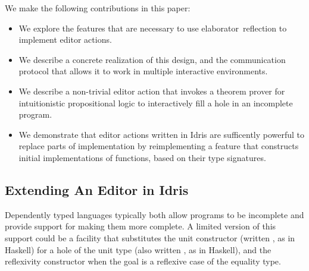 
We make the following contributions in this paper:

\begin{itemize}[topsep=0pt] %
\item We explore the features that are necessary to use
  \mbox{elaborator reflection} to implement editor actions.
\item We describe a concrete realization of this design, and the
  communication protocol that allows it to work in multiple
  interactive environments.
\item We describe a non-trivial editor action that invokes a
  theorem prover for intuitionistic propositional logic to
  interactively fill a hole in an incomplete
  program.
\item We demonstrate that editor actions written in Idris are
  sufficently powerful to replace parts of implementation by
  reimplementing a feature that constructs initial implementations of
  functions, based on their type signatures.
\end{itemize}


\subsection{Extending An Editor in Idris}

Dependently typed languages typically both allow programs to be
incomplete and provide support for making them more complete. A
limited version of this support could be a facility that substitutes
the unit constructor (written \dt{()}, as in Haskell) for a hole of
the unit type (also written \ty{()}, as in Haskell), and the
reflexivity constructor  when the goal is a reflexive case of
the equality type.


